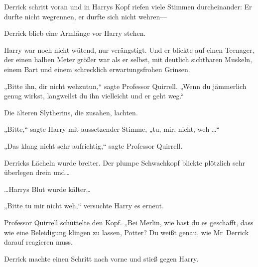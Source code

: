 Derrick schritt voran und in Harrys Kopf riefen viele Stimmen durcheinander: Er durfte nicht wegrennen, er durfte sich nicht wehren—

Derrick blieb eine Armlänge vor Harry stehen.

Harry war noch nicht wütend, nur verängstigt. Und er blickte auf einen Teenager, der einen halben Meter größer war als er selbst, mit deutlich sichtbaren Muskeln, einem Bart und einem schrecklich erwartungsfrohen Grinsen.

„Bitte ihn, dir nicht wehzutun,“ sagte Professor Quirrell. „Wenn du jämmerlich genug wirkst, langweilst du ihn vielleicht und er geht weg.“

Die älteren Slytherins, die zusahen, lachten.

„Bitte,“ sagte Harry mit aussetzender Stimme, „tu, mir, nicht, weh …“

„Das klang nicht sehr aufrichtig,“ sagte Professor Quirrell.

Derricks Lächeln wurde breiter. Der plumpe Schwachkopf blickte plötzlich sehr überlegen drein und…

…Harrys Blut wurde kälter…

„Bitte tu mir nicht weh,“ versuchte Harry es erneut.

Professor Quirrell schüttelte den Kopf. „Bei Merlin, wie hast du es geschafft, dass wie eine Beleidigung klingen zu lassen, Potter? Du weißt genau, wie Mr~Derrick darauf reagieren muss.

Derrick machte einen Schritt nach vorne und stieß gegen Harry.

